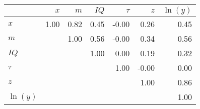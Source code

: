 \begin{tabular}{lrrrrrr}
\hline
 & $x$  & $m$  & $IQ$  & $\tau$  & $z$  & $\ln(y)$  \\ 
\hline
$x$ & 1.00  & 0.82  & 0.45  & -0.00  & 0.26  & 0.45  \\ 
$m$ &   & 1.00  & 0.56  & -0.00  & 0.34  & 0.56  \\ 
$IQ$ &   &   & 1.00  & 0.00  & 0.19  & 0.32  \\ 
$\tau$ &   &   &   & 1.00  & -0.00  & 0.00  \\ 
$z$ &   &   &   &   & 1.00  & 0.86  \\ 
$\ln(y)$ &   &   &   &   &   & 1.00  \\ 
\hline
\end{tabular}%
